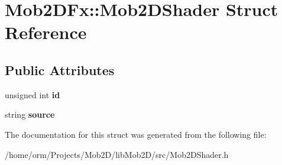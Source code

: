 \hypertarget{structMob2DFx_1_1Mob2DShader}{
\section{Mob2DFx::Mob2DShader Struct Reference}
\label{structMob2DFx_1_1Mob2DShader}
}
\subsection*{Public Attributes}
\begin{DoxyCompactItemize}
\item 
\hypertarget{structMob2DFx_1_1Mob2DShader_a419842da8f02655d34736c3f2fca731a}{
unsigned int {\bfseries id}}
\label{structMob2DFx_1_1Mob2DShader_a419842da8f02655d34736c3f2fca731a}

\item 
\hypertarget{structMob2DFx_1_1Mob2DShader_afb2701445933309427f56ae197478bee}{
string {\bfseries source}}
\label{structMob2DFx_1_1Mob2DShader_afb2701445933309427f56ae197478bee}

\end{DoxyCompactItemize}


The documentation for this struct was generated from the following file:\begin{DoxyCompactItemize}
\item 
/home/orm/Projects/Mob2D/libMob2D/src/Mob2DShader.h\end{DoxyCompactItemize}

